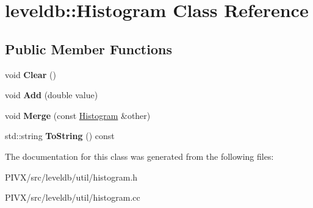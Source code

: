 \hypertarget{classleveldb_1_1_histogram}{}\section{leveldb\+:\+:Histogram Class Reference}
\label{classleveldb_1_1_histogram}
\subsection*{Public Member Functions}
\begin{DoxyCompactItemize}
\item 
\mbox{\label{classleveldb_1_1_histogram_ab30a7e767693010656d90bfd361ecb91}} 
void {\bfseries Clear} ()
\item 
\mbox{\label{classleveldb_1_1_histogram_a7dd7147b7f6548f0bebde25ca40e4457}} 
void {\bfseries Add} (double value)
\item 
\mbox{\label{classleveldb_1_1_histogram_a22befd197208f0142b236917bcadf196}} 
void {\bfseries Merge} (const \mbox{\hyperlink{classleveldb_1_1_histogram}{Histogram}} \&other)
\item 
\mbox{\label{classleveldb_1_1_histogram_a4f261a05d287a3d9b65508502e0d646e}} 
std\+::string {\bfseries To\+String} () const
\end{DoxyCompactItemize}


The documentation for this class was generated from the following files\+:\begin{DoxyCompactItemize}
\item 
P\+I\+V\+X/src/leveldb/util/histogram.\+h\item 
P\+I\+V\+X/src/leveldb/util/histogram.\+cc\end{DoxyCompactItemize}
